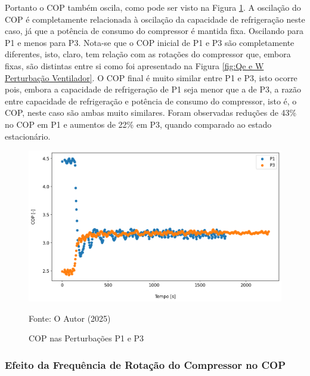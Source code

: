 Portanto o COP também oscila, como pode ser visto na Figura \ref{fig:COP Perturbação Ventilador}. A oscilação do COP é completamente relacionada à oscilação da capacidade de refrigeração neste caso, já que a potência de consumo do compressor é mantida fixa. Oscilando para P1 e menos para P3. Nota-se que o COP inicial de P1 e P3 são completamente diferentes, isto, claro, tem relação com as rotações do compressor que, embora fixas, são distintas entre si como foi apresentado na Figura \ref{fig:Qe e W Perturbação Ventilador}. O COP final é muito similar entre P1 e P3, isto ocorre pois, embora a capacidade de refrigeração de P1 seja menor que a de P3, a razão entre capacidade de refrigeração e potência de consumo do compressor, isto é, o COP, neste caso são ambas muito similares. Foram observadas reduções de 43\% no COP em P1 e aumentos de 22\% em P3, quando comparado ao estado estacionário.
\newpage
\begin{figure}[h]
    \centering
    \includegraphics[width=1\linewidth]{FigurasdoTexto/COP Perturbação Ventilador.png}
    \caption{COP nas Perturbações P1 e P3}
    \label{fig:COP Perturbação Ventilador}
    {\footnotesize Fonte: O Autor (2025)}
\end{figure}

\subsubsection{Efeito da Frequência de Rotação do Compressor no COP}

